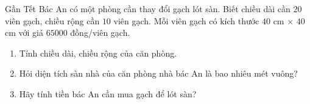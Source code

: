 \begin{ex}%
	Gần Tết Bác An có một phòng cần thay đổi gạch lót sàn. Biết chiều dài cần $20$ viên gạch, chiều rộng cần $10$ viên gạch. Mỗi viên gạch có kích thước $40$ cm $\times$ $40$ cm với giá $65000$ đồng/viên gạch.
	\begin{enumerate}[\qquad 1)]
		\item Tính chiều dài, chiều rộng của căn phòng.
		\item Hỏi diện tích sàn nhà của căn phòng nhà bác An là bao nhiêu mét vuông?
		\item Hãy tính tiền bác An cần mua gạch để lót sàn?
	\end{enumerate}
\end{ex}
